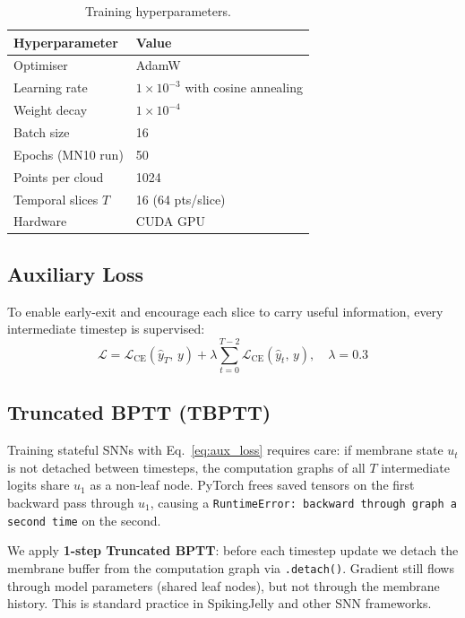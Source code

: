 \documentclass[11pt,a4paper]{article}
\begin{document}
\begin{table}[H]
  \centering
  \caption{Training hyperparameters.}
  \label{tab:hyper}
  \begin{tabular}{ll}
    \toprule
    \textbf{Hyperparameter} & \textbf{Value} \\
    \midrule
    Optimiser           & AdamW \\
    Learning rate       & $1\times10^{-3}$ with cosine annealing \\
    Weight decay        & $1\times10^{-4}$ \\
    Batch size          & 16 \\
    Epochs (MN10 run)   & 50 \\
    Points per cloud    & 1024 \\
    Temporal slices $T$ & 16 (64 pts/slice) \\
    Hardware            & CUDA GPU \\
    \bottomrule
  \end{tabular}
\end{table}

\subsection{Auxiliary Loss}

To enable early-exit and encourage each slice to carry useful information,
every intermediate timestep is supervised:
\begin{equation}
  \mathcal{L} = \mathcal{L}_\text{CE}(\hat{y}_T,\, y)
              + \lambda \sum_{t=0}^{T-2} \mathcal{L}_\text{CE}(\hat{y}_t,\, y),
              \quad \lambda = 0.3
  \label{eq:aux_loss}
\end{equation}

\subsection{Truncated BPTT (TBPTT)}

Training stateful SNNs with Eq.~\eqref{eq:aux_loss} requires care: if membrane
state $u_t$ is not detached between timesteps, the computation graphs of all
$T$ intermediate logits share $u_1$ as a non-leaf node. PyTorch frees saved
tensors on the first backward pass through $u_1$, causing a
\texttt{RuntimeError: backward through graph a second time} on the second.

We apply \textbf{1-step Truncated BPTT}: before each timestep update we detach
the membrane buffer from the computation graph via \texttt{.detach()}. Gradient
still flows through model parameters (shared leaf nodes), but not through the
membrane history. This is standard practice in SpikingJelly and other SNN
frameworks.
\end{document}
